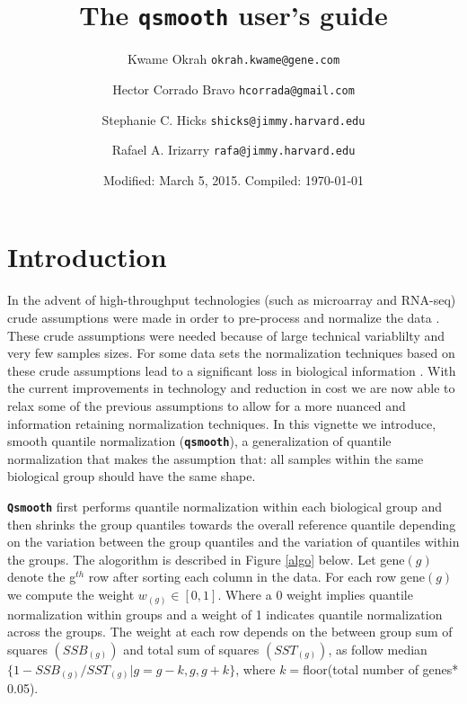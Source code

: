 \documentclass{article}\usepackage[]{graphicx}\usepackage[usenames,dvipsnames]{color}
\title{The \texttt{qsmooth} user's guide}
\author{Kwame Okrah \texttt{okrah.kwame@gene.com} \and
Hector Corrado Bravo \texttt{hcorrada@gmail.com} \and
Stephanie C. Hicks \texttt{shicks@jimmy.harvard.edu} \and
Rafael A. Irizarry \texttt{rafa@jimmy.harvard.edu} }
\date{Modified: March 5, 2015.  Compiled: \today}
\begin{document}
\maketitle
 
\tableofcontents

\section{Introduction}

In the advent of high-throughput technologies
(such as microarray and RNA-seq) crude assumptions 
were made in order to pre-process and normalize 
the data \cite{loven2012revisiting}.
These crude assumptions were needed because
of large technical variablilty and very few samples
sizes. 
For some data sets the normalization techniques 
based on these crude assumptions lead to a 
significant loss in biological information
\cite{loven2012revisiting, hicks}.
With the current improvements in technology and 
reduction in cost we are now able to relax some
of the previous assumptions to allow for a more
nuanced and information retaining normalization 
techniques.
In this vignette we introduce,
smooth quantile normalization (\texttt{\bf{qsmooth}}), 
a generalization of quantile normalization \cite{bolstad2003comparison}
that makes the assumption that: all samples within the same biological 
group should have the same shape.

\texttt{\bf{Qsmooth}} first performs quantile normalization within 
each biological group and then shrinks the group quantiles
towards the overall reference quantile depending on the variation 
between the group quantiles and the variation of quantiles 
within the groups. The alogorithm is described in Figure \ref{algo}
below. Let gene$(g)$ denote the g${}^{th}$ row after sorting each 
column in the data. 
For each row gene$(g)$ we compute the weight $w_{(g)} \in [0, 1]$.
Where a 0 weight implies quantile normalization within groups and
a weight of 1 indicates quantile normalization across the groups.
The weight at each row depends on the between group sum of squares
$(SSB_{(g)})$ and total sum of squares 
$(SST_{(g)})$, as follow median$\{1 - SSB_{(g)} / SST_{(g)} | g = g -k, g, g+k \}$,
where $k=$floor(total number of genes* 0.05).
\end{document}
